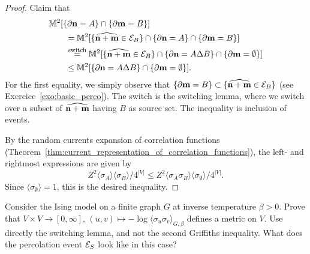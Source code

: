 \begin{proof}
    Claim that
    \begin{align}
        &\M^2[\{\partial\n=A\}\cap\{\partial\m=B\}]
        \\
        &\qquad=
        \M^2[\{\widehat{\n+\m} \in \calE_B\}\cap\{\partial\n=A\}\cap\{\partial\m=B\}]
        \\
        &\qquad\stackrel{\text{switch}}=
        \M^2[\{\widehat{\n+\m} \in \calE_B\}\cap\{\partial\n=A\Delta B\}\cap\{\partial\m=\emptyset\}]
        \\
        &\qquad\leq
        \M^2[\{\partial\n=A\Delta B\}\cap\{\partial\m=\emptyset\}].
    \end{align}
    For the first equality, we simply observe that $\{\partial\mathbf{m}=B\}\subset \{\widehat{\mathbf{n}+\mathbf{m}} \in \mathcal E_B\}$
    (see Exercice~\ref{exo:basic_perco}).
    The switch is the switching lemma, where we switch over a subset of $\widehat{\mathbf{n}+\mathbf{m}}$ 
    having $B$ as source set.
    The inequality is inclusion of events.

    By the random currents expansion of correlation functions (Theorem~\ref{thm:current_representation_of_correlation_functions}),
    the left- and rightmost expressions are given by
    \[
        Z^2\langle\sigma_A\rangle\langle\sigma_B\rangle/4^{|V|}
        \leq
        Z^2\langle\sigma_A\sigma_B\rangle\langle\sigma_\emptyset\rangle/4^{|V|}.
    \]
    Since $\langle\sigma_\emptyset\rangle=1$, this is the desired inequality.
\end{proof}

\begin{exercise}
    Consider the Ising model on a finite graph $G$
    at inverse temperature $\beta>0$.
    Prove that $V\times V\to [0,\infty],\,
    (u,v)\mapsto-\log\langle\sigma_u\sigma_v\rangle_{G,\beta}$
    defines a metric on $V$.
    Use directly the switching lemma, and not the second Griffiths inequality.
    What does the percolation event $\mathcal E_S$ look like in this case?
\end{exercise}


